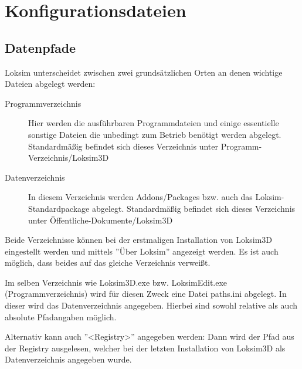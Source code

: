 \section{Konfigurationsdateien}
\subsection{Datenpfade}
\label{sec:sim-optionen-paths}
Loksim unterscheidet zwischen zwei grundsätzlichen Orten an denen wichtige Dateien abgelegt werden:
\begin{description}
\item[Programmverzeichnis] Hier werden die ausführbaren Programmdateien und einige essentielle sonstige Dateien die unbedingt zum Betrieb benötigt werden abgelegt. Standardmäßig befindet sich dieses Verzeichnis unter Programm-Verzeichnis/Loksim3D
\item[Datenverzeichnis] In diesem Verzeichnis werden Addons/Packages bzw. auch das Loksim-Standardpackage abgelegt. Standardmäßig befindet sich dieses Verzeichnis unter Öffentliche-Dokumente/Loksim3D
\end{description}
Beide Verzeichnisse können bei der erstmaligen Installation von Loksim3D eingestellt werden und mittels ''Über Loksim'' angezeigt werden. Es ist auch möglich, dass beides auf das gleiche Verzeichnis verweißt.

Im selben Verzeichnis wie Loksim3D.exe bzw. LoksimEdit.exe (Programmverzeichnis) wird für diesen Zweck eine Datei paths.ini abgelegt. In dieser wird das Datenverzeichnis angegeben. Hierbei sind sowohl relative als auch absolute Pfadangaben möglich.

Alternativ kann auch ''<Registry>'' angegeben werden: Dann wird der Pfad aus der Registry ausgelesen, welcher bei der letzten Installation von Loksim3D als Datenverzeichnis angegeben wurde.